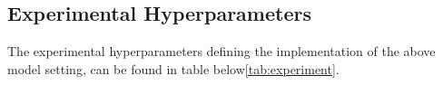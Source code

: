 



%


%


\subsection{Experimental Hyperparameters}\label{subsec:experiement}

The experimental hyperparameters defining the implementation of the above model setting, can be found in
table below\ref{tab:experiment}.

